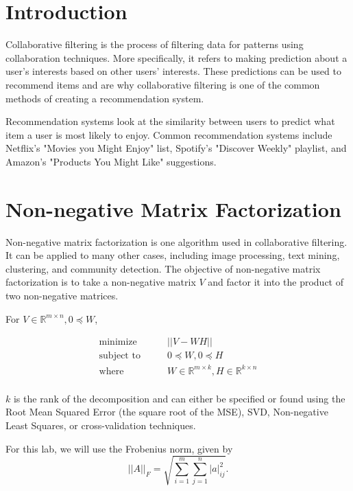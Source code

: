 

\section*{Introduction}
Collaborative filtering is the process of filtering data for patterns using collaboration techniques.
More specifically, it refers to making prediction about a user's interests based on other users' interests.
These predictions can be used to recommend items and are why collaborative filtering is one of the common methods of creating a recommendation system.

Recommendation systems look at the similarity between users to predict what item a user is most likely to enjoy.
Common recommendation systems include Netflix's "Movies you Might Enjoy" list, Spotify's "Discover Weekly" playlist, and Amazon's "Products You Might Like" suggestions.


\section*{Non-negative Matrix Factorization}
Non-negative matrix factorization is one algorithm used in collaborative filtering.
It can be applied to many other cases, including image processing, text mining, clustering, and community detection.
The objective of non-negative matrix factorization is to take a non-negative matrix $V$ and factor it into the product of two non-negative matrices.

For $V\in\mathbb{R}^{m\times n}, 0\preceq W$,


\begin{align*}
\text{minimize}\qquad & ||V-WH|| \\
\text{subject to}\qquad &  0\preceq W, 0\preceq H\\
\text{where}\qquad & W\in\mathbb{R}^{m\times k}, H\in\mathbb{R}^{k\times n}\\
\end{align*}


$k$ is the rank of the decomposition and can either be specified or found using the Root Mean Squared Error (the square root of the MSE), SVD, Non-negative Least Squares, or cross-validation techniques.

For this lab, we will use the Frobenius norm, given by
\[
||A||_{F} = \sqrt{\sum_{i=1}^{m}\sum_{j=1}^{n} |a|_{ij}^{2}}.
\]

